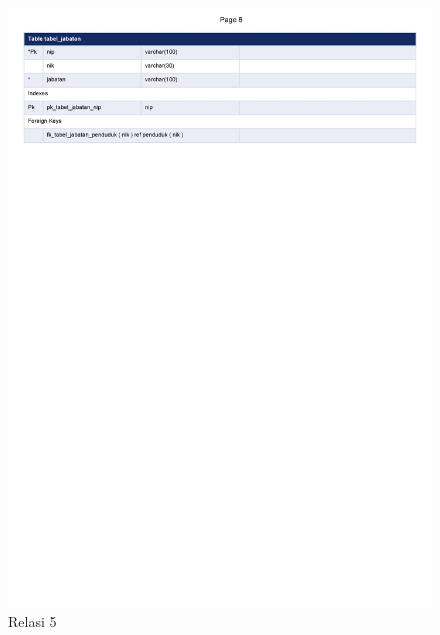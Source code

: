 \begin{figure}[H]
	\centering
	\includegraphics[width=15cm]{figures/0007.jpg}
	\caption{Relasi 5}
\end{figure}

